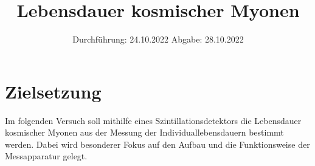 

\usepackage[nolist,nohyperlinks]{acronym}

\usepackage{longtable}


\subject{V01}
\title{Lebensdauer kosmischer Myonen}
\date{
    Durchführung: 24.10.2022
     \hspace{3em}
    Abgabe: 28.10.2022
}


\maketitle
\thispagestyle{empty}
\tableofcontents
\newpage

\section{Zielsetzung}

    Im folgenden Versuch soll mithilfe eines Szintillationsdetektors die Lebensdauer kosmischer Myonen aus der Messung der Individuallebensdauern bestimmt werden.
    Dabei wird besonderer Fokus auf den Aufbau und die Funktionsweise der Messapparatur gelegt.


\clearpage


\clearpage


\clearpage


\clearpage

\printbibliography
\clearpage

\appendix



